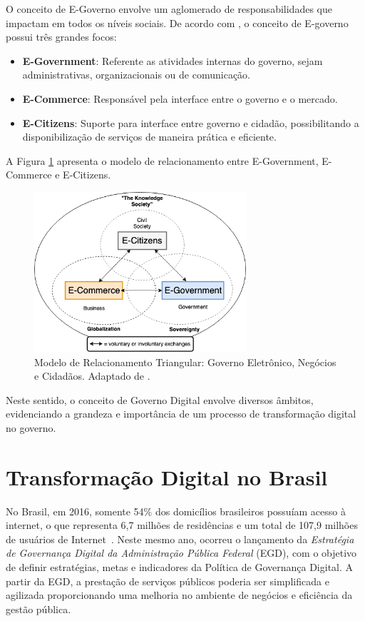 O conceito de E-Governo envolve um aglomerado de responsabilidades que impactam em todos os níveis sociais. De acordo com \cite{fang2002government}, o conceito de E-governo possui três grandes focos: 

\begin{itemize}
    \item \textbf{E-Government}: Referente as atividades internas do governo, sejam administrativas, organizacionais ou de comunicação. 
    \item \textbf{E-Commerce}: Responsável pela interface entre o governo e o mercado.
    \item \textbf{E-Citizens}: Suporte para interface entre governo e cidadão, possibilitando a disponibilização de serviços de maneira prática e eficiente.
\end{itemize}

A Figura \ref{img:triangulo} apresenta o modelo de relacionamento entre E-Government, E-Commerce e E-Citizens.

\begin{figure}[!htb]
\centering
\includegraphics[width=0.7\textwidth]{figuras/relacao_triangular_e-gov.png}
\caption{Modelo de Relacionamento Triangular: Governo Eletrônico, Negócios e Cidadãos. Adaptado de \cite{fang2002government}.}
\label{img:triangulo}
\end{figure}

Neste sentido, o conceito de Governo Digital envolve diversos âmbitos, evidenciando a grandeza e importância de um processo de transformação digital no governo.


\section{Transformação Digital no Brasil}

No Brasil, em 2016, somente 54\% dos domicílios brasileiros possuíam acesso à internet, o que representa 6,7 milhões de residências e um total de 107,9 milhões de usuários de Internet~\cite{CGI}. Neste mesmo ano, ocorreu o lançamento da \textit{Estratégia de Governança Digital da Administração Pública Federal} (EGD), com o objetivo de definir estratégias, metas e indicadores da Política de Governança Digital. A partir da EGD, a prestação de serviços
públicos poderia ser simplificada e agilizada proporcionando uma melhoria no ambiente de negócios e eficiência da gestão pública.

